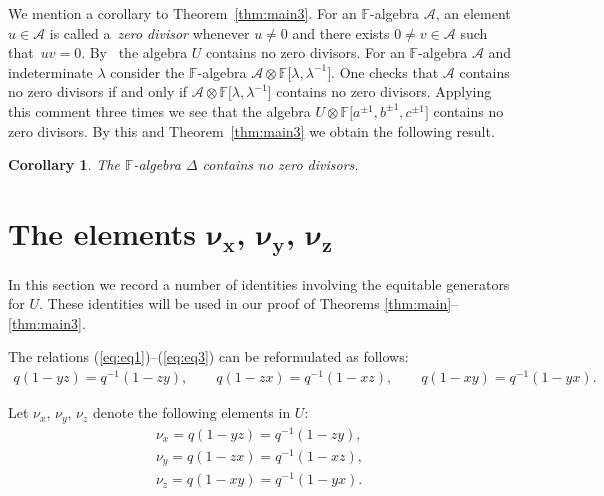\documentclass[pdftex]{sigma}
\numberwithin{equation}{section}
\newtheorem{Corollary}[Theorem]{Corollary}
\begin{document}
We mention a corollary to
Theorem~\ref{thm:main3}.
For an $\mathbb F$-algebra $\mathcal A$,
an element $u \in {\mathcal A}$ is called a~{\it zero divisor}
whenever $u\not=0$ and
there exists $0 \not=v \in \mathcal A$
such that~$uv=0$.
By~\cite[Proposition~1.8]{jantzen}
the
algebra $U$
contains no zero divisors.
For an $\mathbb F$-algebra $\mathcal A$
and indeterminate $\lambda$ consider the $\mathbb F$-algebra
${\mathcal A}\otimes \mathbb F \lbrack \lambda,\lambda^{-1}\rbrack$.
One checks that
$\mathcal A$ contains no zero divisors if and only if
${\mathcal A}\otimes \mathbb F \lbrack \lambda,\lambda^{-1}\rbrack$
contains no zero divisors.
Applying this comment three times we see that
the algebra
$
U \otimes
\mathbb F \lbrack a^{\pm 1}, b^{\pm 1}, c^{\pm 1}\rbrack
$ contains no zero divisors.
By this and
Theorem~\ref{thm:main3} we obtain the following result.

\begin{Corollary}
\label{cor:nozerodiv}
The $\mathbb F$-algebra $\Delta$ contains no zero divisors.
\end{Corollary}


\section[The elements $\nu_x$, $\nu_y$, $\nu_z$]{The elements $\boldsymbol{\nu_x}$, $\boldsymbol{\nu_y}$, $\boldsymbol{\nu_z}$}\label{section3}

In this section we record a number of
identities involving
the equitable generators for
$U$.
These identities will be used in our
proof of Theorems
\ref{thm:main}--\ref{thm:main3}.


The relations
(\ref{eq:eq1})--(\ref{eq:eq3})
can be reformulated as follows:
\begin{gather*}
q(1-yz) = q^{-1}(1-zy),
\qquad
q(1-zx) = q^{-1}(1-xz),
\qquad
q(1-xy) = q^{-1}(1-yx).
\end{gather*}

\begin{Definition}
\label{def:nx}
Let $\nu_x$, $\nu_y$, $\nu_z$ denote the following elements
in
$U$:
\begin{gather}
 \nu_x = q(1-yz)=q^{-1}(1-zy),
\label{eq:defnx}
\\
 \nu_y = q(1-zx)=q^{-1}(1-xz),
\label{eq:defny}
\\
 \nu_z = q(1-xy)=q^{-1}(1-yx).
\label{eq:defnz}
\end{gather}
\end{Definition}
\end{document}
